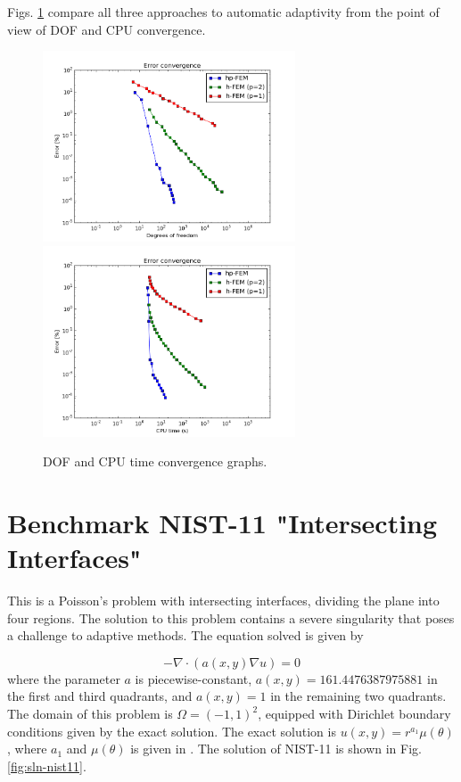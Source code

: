 \documentclass[12pt]{elsarticle}
\begin{document}
Figs. \ref{fig:nist-10-conv} compare all
three approaches to automatic adaptivity from the point
of view of DOF and CPU convergence.

\begin{figure}[H]
\centering
\hspace{-50mm}
\includegraphics[width=7.5cm]{nist/nist-10/conv_dof_aniso.png}\ \
\hspace{-10mm}
\includegraphics[width=7.5cm]{nist/nist-10/conv_cpu_aniso.png}
\hspace{-50mm}
\vspace{-2mm}
\caption{DOF and CPU time convergence graphs.}
\label{fig:nist-10-conv}
\end{figure}


\section{Benchmark NIST-11 "Intersecting Interfaces"}
\label{sec:bench-11}

This is a Poisson's problem with intersecting interfaces,
dividing the plane into four regions.
The solution to this problem contains a severe
singularity that poses a challenge to adaptive methods.
The equation solved is given by

\begin{equation} \label{intersecting}
-\nabla \cdot (a(x,y) \nabla u) = 0
\end{equation}
where the parameter $a$ is piecewise-constant,
$a(x,y) = 161.4476387975881$ in the first and third quadrants,
and $a(x,y) = 1$ in the remaining two quadrants.
The domain of this problem is $\Omega = (-1, 1)^2$, equipped with
Dirichlet boundary conditions given by the exact solution.
The exact solution is
$u(x,y) = r^{a_1} \mu (\theta)$,
where $a_1$ and $\mu (\theta)$ is given in \cite{mitchell-1}.
The solution of NIST-11 is shown in Fig. \ref{fig:sln-nist11}.
\end{document}
